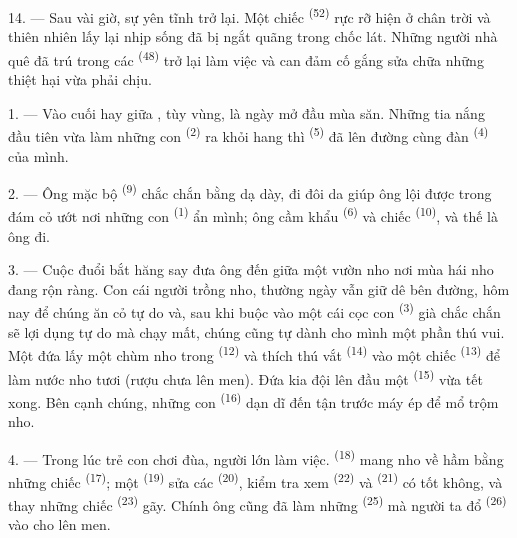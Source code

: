 14. --- Sau vài giờ, sự yên tĩnh trở lại. Một chiếc 
\textsuperscript{(52)} rực rỡ hiện ở chân trời và thiên nhiên lấy lại nhịp sống đã bị
ngắt quãng trong chốc lát. Những người nhà quê đã trú trong các 
\textsuperscript{(48)} trở lại làm việc và can đảm cố gắng sửa chữa những thiệt hại vừa
phải chịu.

\VUsaut{6.0mm}
\VUsaut{3.6mm}

\VUsaut{1.4mm}
\VUsaut{4.0mm}

1. --- Vào cuối  hay giữa , tùy vùng, là ngày mở
đầu mùa săn. Những tia nắng đầu tiên vừa làm những con 
\textsuperscript{(2)} ra khỏi hang thì  \textsuperscript{(5)} đã
lên đường cùng đàn  \textsuperscript{(4)} của mình.

2. --- Ông mặc bộ  \textsuperscript{(9)} chắc chắn bằng dạ dày, đi
đôi  da giúp ông lội được trong đám cỏ ướt nơi những con 
\textsuperscript{(1)} ẩn mình; ông cầm khẩu  \textsuperscript{(6)} và chiếc
 \textsuperscript{(10)}, và thế là ông đi.

3. --- Cuộc đuổi bắt hăng say đưa ông đến giữa một vườn nho nơi mùa hái nho đang rộn
ràng. Con cái người trồng nho, thường ngày vẫn giữ dê bên đường, hôm nay để chúng ăn cỏ
tự do và, sau khi buộc vào một cái cọc con  \textsuperscript{(3)} già
chắc chắn sẽ lợi dụng tự do mà chạy mất, chúng cũng tự dành cho mình một phần thú vui.
Một đứa lấy một chùm nho trong  \textsuperscript{(12)} và thích thú
vắt  \textsuperscript{(14)} vào một chiếc 
\textsuperscript{(13)} để làm nước nho tươi (rượu chưa lên men). Đứa kia đội lên đầu một
 \textsuperscript{(15)} vừa tết xong. Bên cạnh chúng, những con  \textsuperscript{(16)} dạn dĩ đến tận trước máy ép để mổ trộm nho.

4. --- Trong lúc trẻ con chơi đùa, người lớn làm việc. 
\textsuperscript{(18)} mang nho về hầm bằng những chiếc 
\textsuperscript{(17)}; một  \textsuperscript{(19)} sửa các
 \textsuperscript{(20)}, kiểm tra xem 
\textsuperscript{(22)} và  \textsuperscript{(21)} có tốt không, và
thay những chiếc  \textsuperscript{(23)} gãy. Chính ông cũng đã làm những
 \textsuperscript{(25)} mà người ta đổ 
\textsuperscript{(26)} vào cho lên men.

